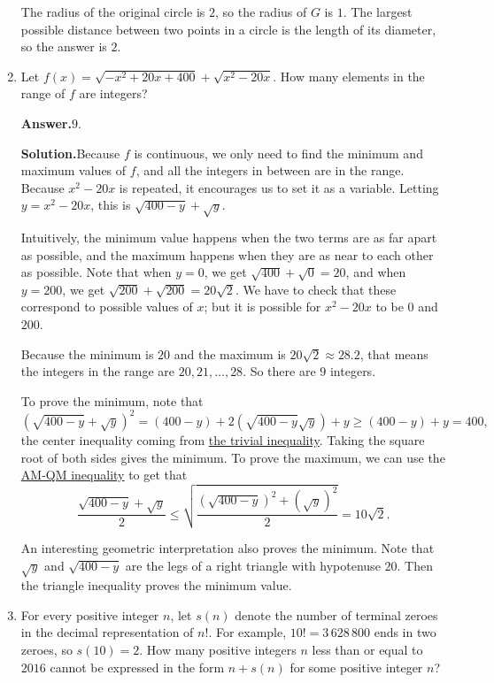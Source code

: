 \documentclass[11pt,paper=letter]{scrartcl}
\newcommand{\ans}[1]{{\sffamily \bfseries Answer.}\;\(\boxed{\text{#1}}\).}
\newcommand{\sol}{{\sffamily \bfseries Solution.}\;}
\newenvironment{rem}%
{\noindent \ignorespaces \small \sffamily \sansmath {\bfseries Remark.}}%
{\ignorespacesafterend}
\begin{document}
\begin{enumerate}[left=0pt]
The radius of the original circle is $2$, so the radius of $G$ is $1$. The largest possible distance between two points in a circle is the length of its diameter, so the answer is $2$.

\item Let $f(x) = \sqrt{-x^2 + 20x + 400} + \sqrt{x^2 - 20x}$. How many elements in the range of $f$ are integers?

\ans{$9$}

\sol Because $f$ is continuous, we only need to find the minimum and maximum values of $f$, and all the integers in between are in the range. Because $x^2 - 20x$ is repeated, it encourages us to set it as a variable. Letting $y = x^2 - 20x$, this is $\sqrt{400 - y} + \sqrt{y}$.

Intuitively, the minimum value happens when the two terms are as far apart as possible, and the maximum happens when they are as near to each other as possible. Note that when $y = 0$, we get $\sqrt{400} + \sqrt{0} = 20$, and when $y = 200$, we get $\sqrt{200} + \sqrt{200} = 20\sqrt{2}$. We have to check that these correspond to possible values of $x$; but it is possible for $x^2 - 20x$ to be $0$ and $200$.

Because the minimum is $20$ and the maximum is $20\sqrt{2} \approx 28.2$, that means the integers in the range are $20, 21, \ldots, 28$. So there are $9$ integers.

To prove the minimum, note that \[
\left(\sqrt{400 - y} + \sqrt{y}\right)^2
= (400 - y) + 2\left(\sqrt{400 - y}\sqrt{y}\right) + y
\ge (400 - y) + y = 400,
\]
the center inequality coming from \href{https://artofproblemsolving.com/wiki/index.php/Trivial_Inequality}{the trivial inequality}. Taking the square root of both sides gives the minimum. To prove the maximum, we can use the \href{https://en.wikipedia.org/wiki/HM-GM-AM-QM_inequalities}{AM-QM inequality} to get that \[
\frac{\sqrt{400 - y} + \sqrt{y}}{2} \le \sqrt{\frac{\left(\sqrt{400 - y}\right)^2 + \left(\sqrt{y}\right)^2}{2}} = 10\sqrt{2}.
\]

\begin{rem}
An interesting geometric interpretation also proves the minimum. Note that $\sqrt{y}$ and $\sqrt{400 - y}$ are the legs of a right triangle with hypotenuse $20$. Then the triangle inequality proves the minimum value.
\end{rem}

\item For every positive integer $n$, let $s(n)$ denote the number of terminal zeroes in the decimal representation of $n!$. For example, $10! = 3\,628\,800$ ends in two zeroes, so $s(10) = 2$. How many positive integers $n$ less than or equal to $2016$ cannot be expressed in the form $n + s(n)$ for some positive integer $n$?


\end{enumerate}
\end{document}
